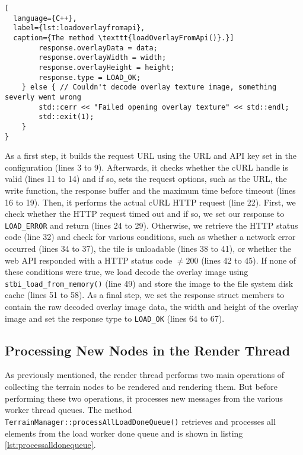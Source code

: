 \begin{lstlisting}[
  language={C++},
  label={lst:loadoverlayfromapi},
  caption={The method \texttt{loadOverlayFromApi()}.}]
        response.overlayData = data;
        response.overlayWidth = width;
        response.overlayHeight = height;
        response.type = LOAD_OK;
    } else { // Couldn't decode overlay texture image, something severly went wrong
        std::cerr << "Failed opening overlay texture" << std::endl;
        std::exit(1);
    }
}
\end{lstlisting}
As a first step, it builds the request URL using the URL and 
API key set in the configuration (lines 3 to 9). Afterwards, it checks 
whether the cURL handle is valid (lines 11 to 14) and if so, sets 
the request options, such as the URL, 
the write function, the response buffer
and the maximum time before timeout (lines 16 to 19).
Then, it performs the actual cURL HTTP request (line 22).
First, we check whether the HTTP request timed out and if so, we 
set our response to \texttt{LOAD\_ERROR} and return (lines 24 to 29).
Otherwise, we retrieve the HTTP status code (line 32) and 
check for various conditions, such as whether a network 
error occurred (lines 34 to 37), the tile is unloadable (lines 38 to 41),
or whether the web API responded with a HTTP status code $\neq 200$ (lines 42 to 45).
If none of these conditions were true, we load decode the overlay image 
using \texttt{stbi\_load\_from\_memory()} (line 49) and 
store the image to the file system disk cache (lines 51 to 58).
As a final step, we set the response struct members
to contain the raw decoded overlay image data, the width and height of the overlay image 
and set the response type to \texttt{LOAD\_OK} (lines 64 to 67).

\subsection{Processing New Nodes in the Render Thread}
As previously mentioned, the render thread performs two main operations 
of collecting the terrain nodes to be rendered and rendering them.
But before performing these two operations, it processes new 
messages from the various worker thread queues.
The method \texttt{TerrainManager::processAllLoadDoneQueue()} 
retrieves and processes all elements from the load worker done queue 
and is shown in listing \ref{lst:processalldonequeue}.

